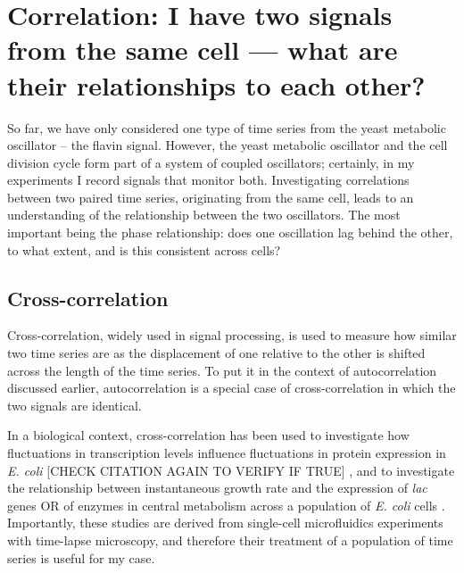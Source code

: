 

\section[Correlation]{Correlation: I have two signals from the same cell --- what are their relationships to each other?}
\label{sec:analysis-correlation}

So far, we have only considered one type of time series from the yeast metabolic oscillator -- the flavin signal.
However, the yeast metabolic oscillator and the cell division cycle form part of a system of coupled oscillators; certainly, in my experiments I record signals that monitor both.
Investigating correlations between two paired time series, originating from the same cell, leads to an understanding of the relationship between the two oscillators.
The most important being the phase relationship: does one oscillation lag behind the other, to what extent, and is this consistent across cells?

\subsection{Cross-correlation}
\label{sec:analysis-correlation-xcf}

Cross-correlation, widely used in signal processing, is used to measure how similar two time series are as the displacement of one relative to the other is shifted across the length of the time series.
To put it in the context of autocorrelation discussed earlier, autocorrelation is a special case of cross-correlation in which the two signals are identical.

In a biological context, cross-correlation has been used to investigate how fluctuations in transcription levels influence fluctuations in protein expression in \textit{E. coli} [CHECK CITATION AGAIN TO VERIFY IF TRUE] \parencite{dunlopRegulatoryActivityRevealed2008},
and to investigate the relationship between instantaneous growth rate and the expression of \textit{lac} genes OR of enzymes in central metabolism across a population of \textit{E. coli} cells \parencite{kivietStochasticityMetabolismGrowth2014}.
Importantly, these studies are derived from single-cell microfluidics experiments with time-lapse microscopy, and therefore their treatment of a population of time series is useful for my case.


